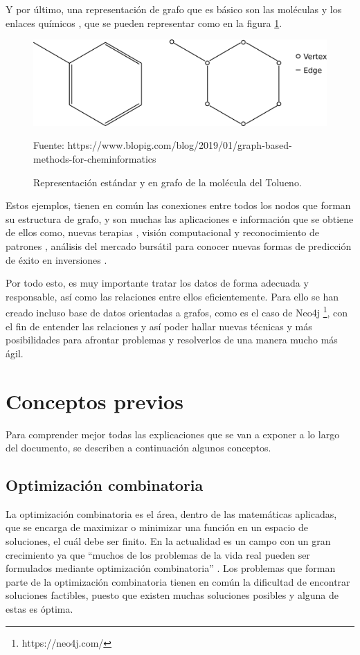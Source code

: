 Y por último, una representación de grafo que es básico son las moléculas y los enlaces químicos \cite{grafo-molecula}, que se pueden representar como en la figura \ref{fig:molecula-graph}.

 \begin{figure}[H]
	\centering
	\includegraphics[scale=0.3]{Figures/molecula-graph.pdf}
	\caption{Representación estándar y en grafo de la molécula del Tolueno.}
	\scriptsize Fuente: https://www.blopig.com/blog/2019/01/graph-based-methods-for-cheminformatics
	\label{fig:molecula-graph}
\end{figure}

Estos ejemplos, tienen en común las conexiones entre todos los nodos que forman su estructura de grafo, y son muchas las aplicaciones e información que se obtiene de ellos como, nuevas terapias \cite{top-molec}, visión computacional y reconocimiento de patrones \cite{mcp-compVision}, análisis del mercado bursátil para conocer nuevas formas de predicción de éxito en inversiones \cite{vid-graf-ai}.\newline

Por todo esto, es muy importante tratar los datos de forma adecuada y responsable, así como las relaciones entre ellos eficientemente. Para ello se han creado incluso base de datos orientadas a grafos, como es el caso de Neo4j \footnote{https://neo4j.com/}, con el fin de entender las relaciones y así poder hallar nuevas técnicas y más posibilidades para afrontar problemas y resolverlos de una manera mucho más ágil.


\section{Conceptos previos}
Para comprender mejor todas las explicaciones que se van a exponer a lo largo del documento, se describen a continuación algunos conceptos.

\subsection{Optimización combinatoria}
La optimización combinatoria es el área, dentro de las matemáticas aplicadas, que se encarga de maximizar o minimizar una función en un espacio de soluciones, el cuál debe ser finito. En la actualidad es un campo con un gran crecimiento ya que ``muchos de los problemas de la vida real pueden ser formulados mediante optimización combinatoria'' \cite{opt-comb-rg}.
Los problemas que forman parte de la optimización combinatoria tienen en común la dificultad de encontrar soluciones factibles, puesto que existen muchas soluciones posibles y alguna de estas es óptima.

